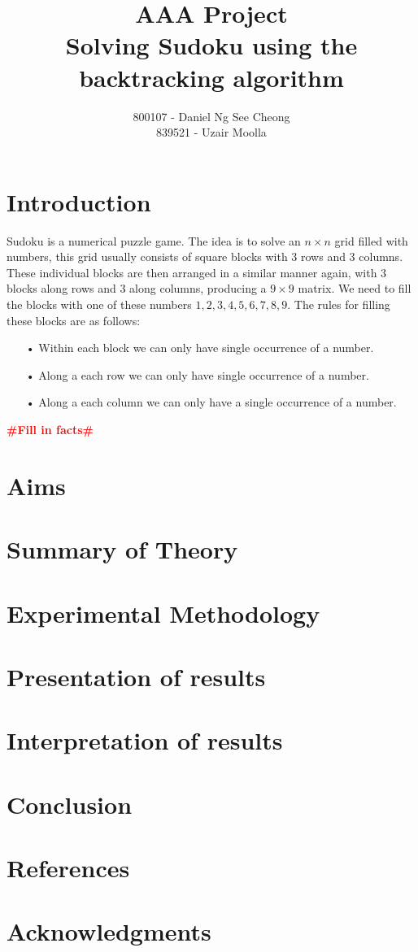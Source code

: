 \documentclass[12pt,a4paper,titlepage]{article}
\author{800107 - Daniel Ng See Cheong\\
		839521 - Uzair Moolla}
\title{
	AAA Project\\
	\large Solving Sudoku using the backtracking algorithm
}
\newcommand{\todo}[1]{\textcolor{red}{\textbf{\##1\#}}}
\begin{document}
\maketitle

\section{Introduction}
Sudoku is a numerical puzzle game. The idea is to solve an $n\times n$ grid filled with numbers, this grid usually consists of square blocks with 3 rows and 3 columns. These individual blocks are then arranged in a similar manner again, with 3 blocks along rows and 3 along columns, producing a $9 \times 9$ matrix. We need to fill the blocks with one of these numbers ${1,2,3,4,5,6,7,8,9}$. The rules for filling these blocks are as follows:
\begin{itemize}
\item[•] Within each block we can only have single occurrence of a number.
\item[•] Along a each row we can only have single occurrence of a number.
\item[•] Along a each column we can only have a single occurrence of a number.
\end{itemize}
\todo{Fill in facts}

\section{Aims}

\section{Summary of Theory}

\section{Experimental Methodology}

\section{Presentation of results}

\section{Interpretation of results}

\section{Conclusion}

\section{References}

\section{Acknowledgments}
\end{document}
